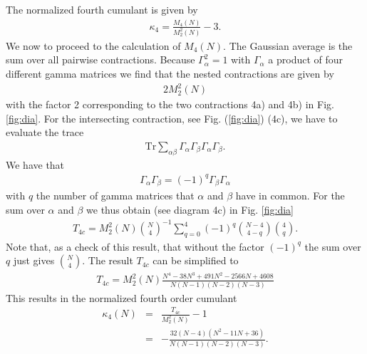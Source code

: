 \documentclass[aps,showpacs,floatfix,superscriptaddress,pre,11pt]{revtex4-1}
\newcommand{\Tr}{\rm Tr}
\newcommand{\eref}[1]{(\ref{#1})}
\newcommand{\nn}{\nonumber}
\newcommand{\be}{\begin{eqnarray}}
\newcommand{\ee}{\end{eqnarray}}
\def\Tr{\textrm{Tr}}
\begin{document}
The normalized fourth cumulant is given by
\be
\kappa_4 = \frac {M_4(N)}{M_2^2(N)} - 3.
  \ee
  We now to proceed to the calculation of $M_4(N)$.
  The Gaussian average is the sum over all pairwise contractions. Because
  $\Gamma_\alpha^2 =1$ with $\Gamma_\alpha $ a product of four different gamma
  matrices we find that the nested contractions are given by
  \be
  2 M_2^2(N)
  \ee
  with the factor 2 corresponding to the two contractions 4a) and 4b) in Fig. \ref{fig:dia}.
  For the intersecting contraction, see Fig. \eref{fig:dia} (4c), we have to evaluate the trace
  \be
  \Tr\sum_{\alpha \beta} \Gamma_\alpha \Gamma_\beta \Gamma_\alpha \Gamma_\beta.
  \ee
  We have that
  \be
  \Gamma_\alpha \Gamma_\beta = (-1)^q  \Gamma_\beta \Gamma_\alpha
  \ee
  with $q$ the number of gamma matrices that $\alpha$ and $\beta$
  have in common.  For the sum over $\alpha$ and $\beta$ we thus
  obtain (see diagram 4c) in Fig. \ref{fig:dia}
  \be
  T_{4c}=  M_2^2(N){N\choose 4}^{-1}
    \sum_{q=0}^4(-1)^q
{N-4 \choose 4-q}{4\choose q}.
        \ee
        Note that, as a check of this result, that  without the
        factor $(-1)^q$ the sum over $q$ just gives
${N\choose 4}$.
          The result $T_{4c}$ can be simplified to
          \be
          T_{4c} = M_2^2(N)\frac{N^4 -38N^3+491N^2-2566N+4608}{N(N-1)(N-2)(N-3)}
          \ee
          This results in the normalized fourth order cumulant
           \be
          \kappa_4(N)&=&  \frac{T_{4c}}{M_2^2(N)}-1\nn \\
          &=& -\frac{32(N-4)(N^2-11N+36)}{N(N-1)(N-2)(N-3)}.
          \ee
\end{document}
